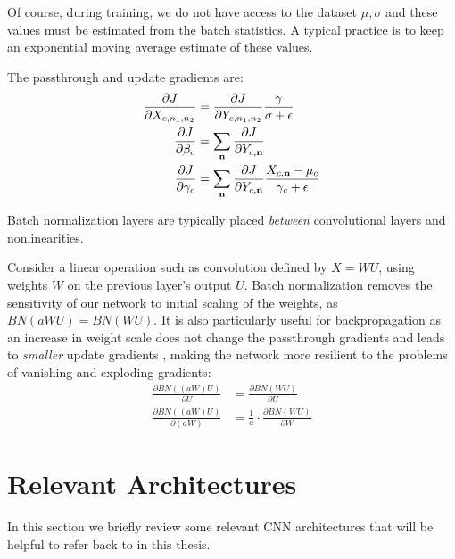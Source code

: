 Of course, during training, we do not have access to the dataset $\mu, \sigma$
and these values must be estimated from the batch statistics. A typical practice
is to keep an exponential moving average estimate of these values.

The passthrough and update gradients are:
\begin{align}
  \frac{\partial J}{\partial X_{c, n_1, n_2}} &= \frac{\partial J}{\partial Y_{c, n_1, n_2}}\frac{\gamma}{\sigma + \epsilon}\\
  \frac{\partial J}{\partial \beta_c} &=  \sum_{\mathbf{n}} \frac{\partial J}{\partial Y_{c, \mathbf{n}}}\\
  \frac{\partial J}{\partial \gamma_c} &= \sum_{\mathbf{n}} \frac{\partial J}{\partial Y_{c, \mathbf{n}}}\frac{X_{c, \mathbf{n}} - \mu_c}{\gamma_c + \epsilon}
\end{align}

Batch normalization layers are typically placed \emph{between} convolutional layers
and nonlinearities. 

Consider a linear operation such as convolution defined by $X = WU$, using
weights $W$ on the previous layer's output $U$. Batch normalization 
removes the sensitivity of our network to
initial scaling of the weights, as 
$BN(aWU) = BN(WU)$.  
It is also particularly useful for backpropagation as an increase in weight
scale does not change the passthrough gradients and leads to \emph{smaller}
update gradients \cite{ioffe_batch_2015}, making the network more resilient to
the problems of vanishing and exploding gradients:
\begin{align}
  \frac{\partial BN((aW)U)}{\partial U} & =  \frac{\partial
  BN(WU)}{\partial U} \nonumber\\
  \frac{\partial BN((aW)U)}{\partial (aW)} & =  \frac{1}{a} \cdot \frac{\partial
  BN(WU)}{\partial W} 
\end{align}

\section{Relevant Architectures}
In this section we briefly review some relevant CNN architectures that will be
helpful to refer back to in this thesis. 

